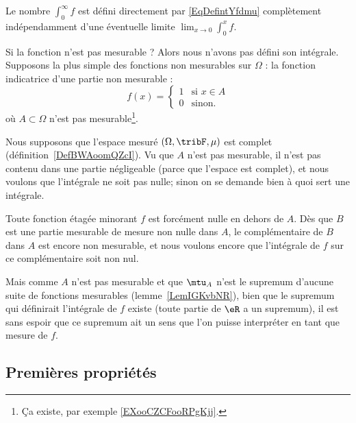 \begin{normaltext}
    Le nombre \( \int_0^{\infty}f\) est défini directement par \eqref{EqDefintYfdmu} complètement indépendamment d'une éventuelle limite \( \lim_{x\to 0} \int_0^xf\).
\end{normaltext}

\begin{normaltext}      \label{NORMooXTGBooKDnAhZ}
    Si la fonction n'est pas mesurable ? Alors nous n'avons pas défini son intégrale. Supposons la plus simple des fonctions non mesurables sur \( \Omega\) : la fonction indicatrice d'une partie non mesurable :
    \begin{equation}
        f(x)=\begin{cases}
            1    &   \text{si } x\in A\\
            0    &    \text{sinon. }
        \end{cases}
    \end{equation}
    où \( A\subset \Omega\) n'est pas mesurable\footnote{Ça existe, par exemple \ref{EXooCZCFooRPgKjj}.}.

    Nous supposons que l'espace mesuré \( (\Omega,\tribF,\mu)\) est complet (définition~\ref{DefBWAoomQZcI}). Vu que \( A\) n'est pas mesurable, il n'est pas contenu dans une partie négligeable (parce que l'espace est complet), et nous voulons que l'intégrale ne soit pas nulle; sinon on se demande bien à quoi sert une intégrale.

    Toute fonction étagée minorant \( f\) est forcément nulle en dehors de \( A\). Dès que \( B\) est une partie mesurable de mesure non nulle dans \( A\), le complémentaire de \( B\) dans \( A\) est encore non mesurable, et nous voulons encore que l'intégrale de \( f\) sur ce complémentaire soit non nul.

    Mais comme \( A\) n'est pas mesurable et que \( \mtu_A\) n'est le supremum d'aucune suite de fonctions mesurables (lemme~\ref{LemIGKvbNR}), bien que le supremum qui définirait l'intégrale de \( f\) existe (toute partie de \( \eR\) a un supremum), il est sans espoir que ce supremum ait un sens que l'on puisse interpréter en tant que mesure de \( f\).
\end{normaltext}

\subsection{Premières propriétés}

